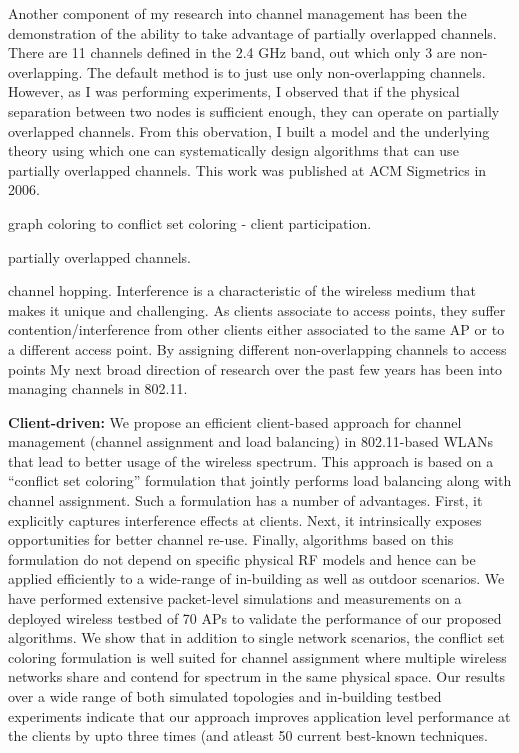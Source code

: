 \documentclass[11pt,letterpaper]{article}
\begin{document}
Another component of my research into channel management has been the demonstration of the ability to take
advantage of partially overlapped channels. There are 11 channels defined in the 2.4 GHz band, out which only
3 are non-overlapping. The default method is to just use only non-overlapping channels. However, as I was performing
experiments, I observed that if the physical separation between two nodes is sufficient enough, they can operate on
partially overlapped channels. From this obervation, I built a model and the underlying theory using which one
can systematically design algorithms that can use partially overlapped channels. This work was published at 
ACM Sigmetrics in 2006.  
 
graph coloring to conflict set coloring - client participation.

partially overlapped channels.

channel hopping.
Interference is a characteristic of the wireless medium that makes it unique and challenging. As clients associate
to access points, they suffer contention/interference from other clients either associated to the same AP  
or to a different access point. By assigning different non-overlapping channels to access points
 My next broad direction
of research over the past few years has been into managing channels in 802.11. 

{\bf Client-driven:}
We propose an efficient client-based approach for
channel management (channel assignment and load balancing)
in 802.11-based WLANs that lead to better usage of the wireless
spectrum. This approach is based on a “conflict set coloring” formulation
that jointly performs load balancing along with channel
assignment. Such a formulation has a number of advantages.
First, it explicitly captures interference effects at clients. Next,
it intrinsically exposes opportunities for better channel re-use.
Finally, algorithms based on this formulation do not depend on
specific physical RF models and hence can be applied efficiently
to a wide-range of in-building as well as outdoor scenarios.
We have performed extensive packet-level simulations and
measurements on a deployed wireless testbed of 70 APs to
validate the performance of our proposed algorithms. We show
that in addition to single network scenarios, the conflict set
coloring formulation is well suited for channel assignment where
multiple wireless networks share and contend for spectrum in
the same physical space. Our results over a wide range of both
simulated topologies and in-building testbed experiments indicate
that our approach improves application level performance at the
clients by upto three times (and atleast 50%
current best-known techniques.
\end{document}
